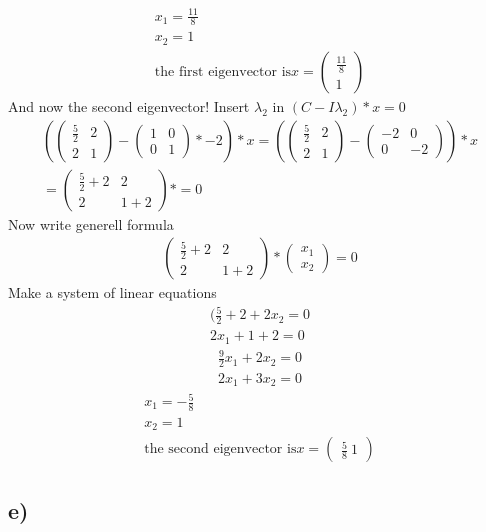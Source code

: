 \documentclass[12pt]{article}
\begin{document}
\begin{gather*}
    x_1 = \frac{11}{8}\\
    x_2 = 1 \\
    \text{the first eigenvector is} x = 
    \begin{pmatrix}
        \frac{11}{8} \\
        1 
   \end{pmatrix}
\end{gather*}
And now the second eigenvector!
Insert $\lambda_2$ in $(C - I\lambda_2) * x = 0 $
\begin{gather*}
    \left (
        \begin{pmatrix}
            \frac{5}{2} & 2 \\
            2 & 1 
    \end{pmatrix}
    -
   \begin{pmatrix}
       1 & 0 \\
            0 & 1 
    \end{pmatrix} 
    * -2  \right ) * x = 
    \left (
        \begin{pmatrix}
            \frac{5}{2} & 2 \\
            2 & 1 
    \end{pmatrix}
    -
   \begin{pmatrix}
       -2  & 0 \\
       0 & -2 
    \end{pmatrix} 
\right ) * x  \\
= \begin{pmatrix}
    \frac{5}{2} + 2  & 2 \\
    2 & 1 +2  
        \end{pmatrix} * = 0 
\end{gather*}
Now  write generell formula
\begin{gather*}
 \begin{pmatrix}
     \frac{5}{2} +2 & 2 \\
     2 & 1 +2 
        \end{pmatrix}  
        *
        \begin{pmatrix}
            x_1 \\
            x_2
        \end{pmatrix}
        =
        0
\end{gather*}
Make a system of linear equations
\begin{align}
    (\frac{5}{2} + 2 + 2x_2 = 0  \\
    2x_1 +1 + 2 = 0 
\end{align}
\begin{align}
    \frac{9}{2}x_1 + 2x_2 = 0  \\
    2x_1 + 3x_2  = 0 
\end{align}
\begin{gather*}
    x_1 = -\frac{5}{8}\\
    x_2 = 1 \\
    \text{the second eigenvector is} x = 
    \begin{pmatrix}
        \frac{5}{8}\
        1
   \end{pmatrix}
\end{gather*}

\subsection{e)}
\end{document}
